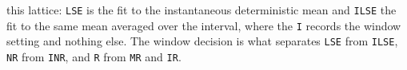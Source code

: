 this lattice: \texttt{LSE} is the fit to the instantaneous deterministic mean and
\texttt{ILSE} the fit to the same mean averaged over the interval, where the \texttt{I}
records the window setting and nothing else. The window decision is what separates
\texttt{LSE} from \texttt{ILSE}, \texttt{NR} from \texttt{INR}, and \texttt{R} from
\texttt{MR} and \texttt{IR}.
